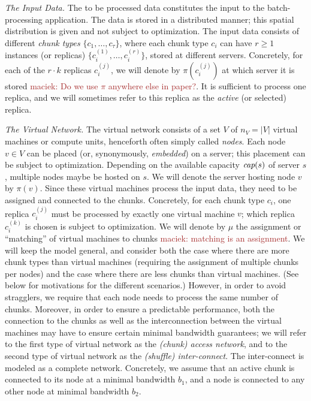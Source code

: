 \documentclass[9pt]{sigcomm-alternate}
\newcommand{\maciek}[1]{\textcolor{brown}{maciek: #1}}
\newcommand{\ChunkType}{\tau}
\newcommand{\VirtualNodes}{\ensuremath{V}}
\newcommand{\achunk}{\ensuremath{c}}
\newcommand{\capacity}{\emph{cap}}
\newcommand{\CostTrans}{\ensuremath{b_1}}
\newcommand{\CostCom}{\ensuremath{b_2}}
\begin{document}
\emph{The Input Data.} The to be processed data constitutes the input to the batch-processing application.
The data is stored in a distributed manner; this spatial distribution is given and not subject to optimization.
The input data consists of different \emph{chunk types} $\{\achunk_1, \ldots, \achunk_{\ChunkType}\}$,
where each chunk type $\achunk_i$ can have $r\geq 1$ instances (or replicas) $\{\achunk_{i}^{(1)},\ldots, \achunk_{i}^{(r)}\}$,
 stored at different servers.
Concretely, for each of the $r\cdot k$ replicas $\achunk_{i}^{(j)}$, we will denote by $\pi(\achunk_{i}^{(j)})$ at
which server it is stored \maciek{Do we use $\pi$ anywhere else in paper?}. It is sufficient to process one replica, and we will sometimes refer to this
replica as the \emph{active} (or selected) replica.

\emph{The Virtual Network.} The virtual network consists of a set $\VirtualNodes$ of $n_V=|\VirtualNodes|$ virtual machines or compute
 units, henceforth often simply called \emph{nodes}.
Each node $v \in \VirtualNodes$ can be placed (or, synonymously, \emph{embedded}) on a server; this placement can be subject
to optimization.
Depending on the available capacity $\capacity(s)$ of server $s$, multiple nodes maybe be hosted on $s$.
We will denote the server hosting node $v$ by $\pi(v)$.
Since these virtual machines process the input data, they need to be assigned and connected to the
chunks. Concretely, for each chunk type $\achunk_i$, one replica $\achunk_{i}^{(j)}$ must be processed by exactly one virtual machine $v$;
which replica $\achunk_{i}^{(k)}$ is chosen is subject to optimization.
We will denote by $\mu$ the assignment or ``matching'' of virtual
machines to chunks \maciek{matching is an assignment}.
We will keep the model general, and consider both the case where there are more chunk types
than virtual machines (requiring the assignment of multiple chunks per nodes) and the case
where there are less chunks than virtual machines. (See below for motivations for the different scenarios.)
However, in order to avoid stragglers, we require that each node needs to process the same number of chunks.
Moreover, in order to ensure a predictable performance, both the connection to the chunks
as well as the interconnection between the virtual machines may have to ensure certain
minimal bandwidth guarantees; we will refer to the first type of virtual network as the \emph{(chunk) access
network}, and to the second type of virtual network as the \emph{(shuffle) inter-connect}. The inter-connect 
is modeled as a complete network. Concretely, we assume that an  active chunk
is connected to its node at a minimal bandwidth $\CostTrans$, and a node is connected to any other node
at minimal bandwidth $\CostCom$.
\end{document}
